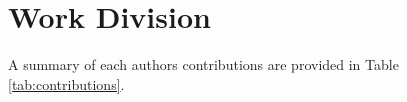 \documentclass[10pt,twocolumn,letterpaper]{article}
\begin{document}














\section{Work Division}

A summary of each authors contributions are provided in Table \ref{tab:contributions}.



\end{document}
